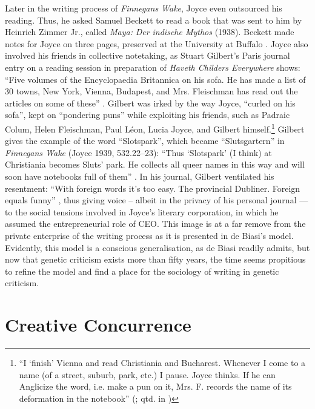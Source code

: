 \begin{paper}
Later in the writing process of \emph{Finnegans Wake}, Joyce even
outsourced his reading. Thus, he asked Samuel Beckett to read a book
that was sent to him by Heinrich Zimmer Jr., called \emph{Maya:}
\emph{Der indische Mythos} (1938). Beckett made notes for Joyce on three
pages, preserved at the University at Buffalo \citep[143ff.]{van_hulle_beckett_1999}.
Joyce also involved his friends in collective notetaking, as Stuart
Gilbert's Paris journal entry on a reading session in preparation of
\emph{Haveth Childers Everywhere} shows: ``Five volumes of the
Encyclopaedia Britannica on his sofa. He has made a list of 30 towns,
New York, Vienna, Budapest, and Mrs. Fleischman has read out the
articles on some of these'' \citep[20--21]{gilbert_reflections_1993}. Gilbert was irked by
the way Joyce, ``curled on his sofa'', kept on ``pondering puns'' while
exploiting his friends, such as Padraic Colum, Helen Fleischman, Paul
Léon, Lucia Joyce, and Gilbert himself.\footnote{``I `finish' Vienna and
  read Christiania and Bucharest. Whenever I come to a name (of a
  street, suburb, park, etc.) I pause. Joyce thinks. If he can Anglicize
  the word, i.e. make a pun on it, Mrs. F. records the name of its
  deformation in the notebook'' (\citealt[20--21]{gilbert_reflections_1993}; qtd. in \citealt[163]{van_hulle_james_2016})} Gilbert gives the example of the word ``Slotspark'',
which became ``Slutsgartern'' in \emph{Finnegans Wake} (Joyce 1939,
532.22--23): ``Thus `Slotspark' (I think) at Christiania becomes Sluts'
park. He collects all queer names in this way and will soon have
notebooks full of them'' \citep[20--21]{gilbert_reflections_1993}. In his journal, Gilbert
ventilated his resentment: ``With foreign words it's too easy. The
provincial Dubliner. Foreign equals funny'' \citep[21]{gilbert_reflections_1993}, thus giving voice --
albeit in the privacy of his personal journal --- to the social tensions
involved in Joyce's literary corporation, in which he assumed the
entrepreneurial role of CEO. This image is at a far remove from the
private enterprise of the writing process as it is presented in de
Biasi's model. Evidently, this model is a conscious generalisation, as
de Biasi readily admits, but now that genetic criticism exists more than
fifty years, the time seems propitious to refine the model and find a
place for the sociology of writing in genetic criticism.

\section{Creative Concurrence}


\end{paper}
